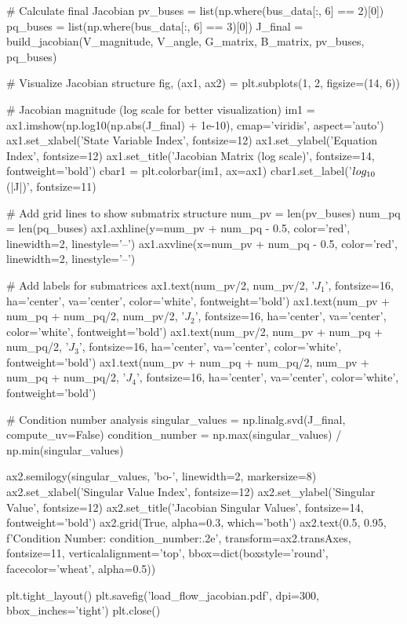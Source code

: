 \documentclass[11pt,a4paper]{article}
\begin{document}
\begin{pycode}
# Calculate final Jacobian
pv_buses = list(np.where(bus_data[:, 6] == 2)[0])
pq_buses = list(np.where(bus_data[:, 6] == 3)[0])
J_final = build_jacobian(V_magnitude, V_angle, G_matrix, B_matrix, pv_buses, pq_buses)

# Visualize Jacobian structure
fig, (ax1, ax2) = plt.subplots(1, 2, figsize=(14, 6))

# Jacobian magnitude (log scale for better visualization)
im1 = ax1.imshow(np.log10(np.abs(J_final) + 1e-10), cmap='viridis', aspect='auto')
ax1.set_xlabel('State Variable Index', fontsize=12)
ax1.set_ylabel('Equation Index', fontsize=12)
ax1.set_title('Jacobian Matrix (log scale)', fontsize=14, fontweight='bold')
cbar1 = plt.colorbar(im1, ax=ax1)
cbar1.set_label('$\\log_{10}$(|J|)', fontsize=11)

# Add grid lines to show submatrix structure
num_pv = len(pv_buses)
num_pq = len(pq_buses)
ax1.axhline(y=num_pv + num_pq - 0.5, color='red', linewidth=2, linestyle='--')
ax1.axvline(x=num_pv + num_pq - 0.5, color='red', linewidth=2, linestyle='--')

# Add labels for submatrices
ax1.text(num_pv/2, num_pv/2, '$J_1$', fontsize=16, ha='center', va='center',
         color='white', fontweight='bold')
ax1.text(num_pv + num_pq + num_pq/2, num_pv/2, '$J_2$', fontsize=16, ha='center',
         va='center', color='white', fontweight='bold')
ax1.text(num_pv/2, num_pv + num_pq + num_pq/2, '$J_3$', fontsize=16, ha='center',
         va='center', color='white', fontweight='bold')
ax1.text(num_pv + num_pq + num_pq/2, num_pv + num_pq + num_pq/2, '$J_4$', fontsize=16,
         ha='center', va='center', color='white', fontweight='bold')

# Condition number analysis
singular_values = np.linalg.svd(J_final, compute_uv=False)
condition_number = np.max(singular_values) / np.min(singular_values)

ax2.semilogy(singular_values, 'bo-', linewidth=2, markersize=8)
ax2.set_xlabel('Singular Value Index', fontsize=12)
ax2.set_ylabel('Singular Value', fontsize=12)
ax2.set_title('Jacobian Singular Values', fontsize=14, fontweight='bold')
ax2.grid(True, alpha=0.3, which='both')
ax2.text(0.5, 0.95, f'Condition Number: {condition_number:.2e}',
         transform=ax2.transAxes, fontsize=11, verticalalignment='top',
         bbox=dict(boxstyle='round', facecolor='wheat', alpha=0.5))

plt.tight_layout()
plt.savefig('load_flow_jacobian.pdf', dpi=300, bbox_inches='tight')
plt.close()
\end{pycode}
\end{document}
